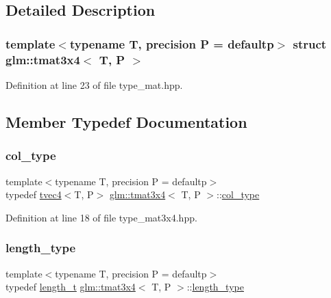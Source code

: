 \subsection{Detailed Description}
\subsubsection*{template$<$typename T, precision P = defaultp$>$\newline
struct glm\+::tmat3x4$<$ T, P $>$}



Definition at line 23 of file type\+\_\+mat.\+hpp.



\subsection{Member Typedef Documentation}
\mbox{\label{structglm_1_1tmat3x4_aa4c8d5353d59216a2f0566ce462fbc81}} 
\subsubsection{\texorpdfstring{col\_type}{col\_type}}
{\footnotesize\ttfamily template$<$typename T, precision P = defaultp$>$ \\
typedef \mbox{\hyperlink{structglm_1_1tvec4}{tvec4}}$<$T, P$>$ \mbox{\hyperlink{structglm_1_1tmat3x4}{glm\+::tmat3x4}}$<$ T, P $>$\+::\mbox{\hyperlink{structglm_1_1tmat3x4_aa4c8d5353d59216a2f0566ce462fbc81}{col\+\_\+type}}}



Definition at line 18 of file type\+\_\+mat3x4.\+hpp.

\mbox{\label{structglm_1_1tmat3x4_ab857d16b90719de3b23d4fa423d20698}} 
\subsubsection{\texorpdfstring{length\_type}{length\_type}}
{\footnotesize\ttfamily template$<$typename T, precision P = defaultp$>$ \\
typedef \mbox{\hyperlink{namespaceglm_a090a0de2260835bee80e71a702492ed9}{length\+\_\+t}} \mbox{\hyperlink{structglm_1_1tmat3x4}{glm\+::tmat3x4}}$<$ T, P $>$\+::\mbox{\hyperlink{structglm_1_1tmat3x4_ab857d16b90719de3b23d4fa423d20698}{length\+\_\+type}}}




